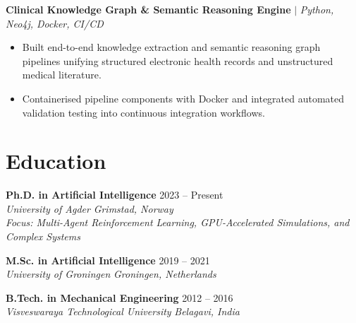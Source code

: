 \documentclass[10pt,a4paper]{article}
\begin{document}
\vspace{2pt}
\textbf{Clinical Knowledge Graph \& Semantic Reasoning Engine} $|$ \textit{Python, Neo4j, Docker, CI/CD} \\
\begin{itemize}[leftmargin=0.15in, label=$\bullet$]
    \item Built end-to-end knowledge extraction and semantic reasoning graph pipelines unifying structured electronic health records and unstructured medical literature.
    \item Containerised pipeline components with Docker and integrated automated validation testing into continuous integration workflows.
\end{itemize}

\section{Education}
\textbf{Ph.D. in Artificial Intelligence} \hfill 2023 -- Present \\
\textit{University of Agder} \hfill \textit{Grimstad, Norway} \\
\textit{Focus: Multi-Agent Reinforcement Learning, GPU-Accelerated Simulations, and Complex Systems}
\vspace{4pt}

\textbf{M.Sc. in Artificial Intelligence} \hfill 2019 -- 2021 \\
\textit{University of Groningen} \hfill \textit{Groningen, Netherlands}
\vspace{4pt}

\textbf{B.Tech. in Mechanical Engineering} \hfill 2012 -- 2016 \\
\textit{Visveswaraya Technological University} \hfill \textit{Belagavi, India}
\end{document}
